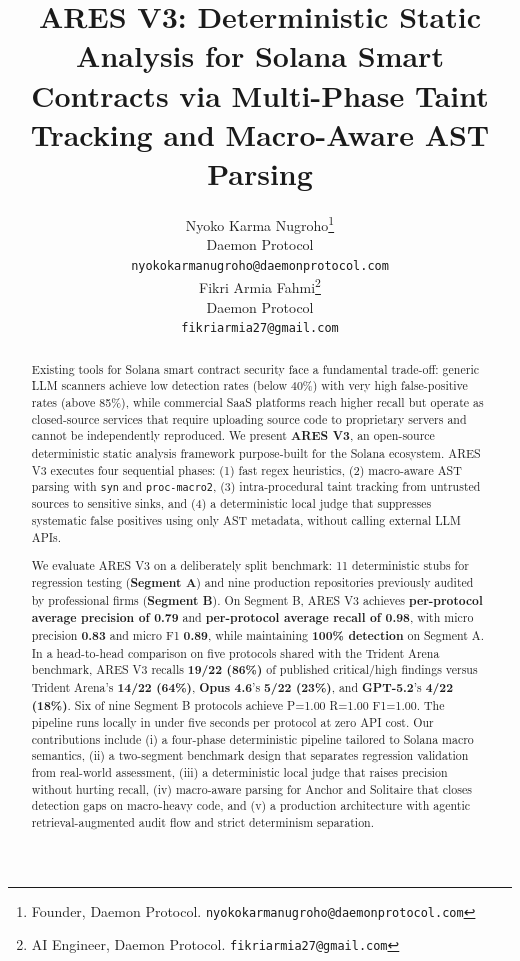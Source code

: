 \documentclass{article}
\title{ARES V3: Deterministic Static Analysis for Solana Smart Contracts via Multi-Phase Taint Tracking and Macro-Aware AST Parsing}
\author{
  Nyoko Karma Nugroho\thanks{Founder, Daemon Protocol. \texttt{nyokokarmanugroho@daemonprotocol.com}} \\
  Daemon Protocol \\
  \texttt{nyokokarmanugroho@daemonprotocol.com} \\
  \And
  Fikri Armia Fahmi\thanks{AI Engineer, Daemon Protocol. \texttt{fikriarmia27@gmail.com}} \\
  Daemon Protocol \\
  \texttt{fikriarmia27@gmail.com} \\
}
\begin{document}
\maketitle

\begin{abstract}
Existing tools for Solana smart contract security face a fundamental trade-off: generic LLM scanners achieve low detection rates (below 40\%) with very high false-positive rates (above 85\%), while commercial SaaS platforms reach higher recall but operate as closed-source services that require uploading source code to proprietary servers and cannot be independently reproduced. We present \textbf{ARES V3}, an open-source deterministic static analysis framework purpose-built for the Solana ecosystem. ARES V3 executes four sequential phases: (1) fast regex heuristics, (2) macro-aware AST parsing with \texttt{syn} and \texttt{proc-macro2}, (3) intra-procedural taint tracking from untrusted sources to sensitive sinks, and (4) a deterministic local judge that suppresses systematic false positives using only AST metadata, without calling external LLM APIs.

We evaluate ARES V3 on a deliberately split benchmark: 11 deterministic stubs for regression testing (\textbf{Segment A}) and nine production repositories previously audited by professional firms (\textbf{Segment B}). On Segment B, ARES V3 achieves \textbf{per-protocol average precision of 0.79} and \textbf{per-protocol average recall of 0.98}, with micro precision \textbf{0.83} and micro F1 \textbf{0.89}, while maintaining \textbf{100\% detection} on Segment A. In a head-to-head comparison on five protocols shared with the Trident Arena benchmark, ARES V3 recalls \textbf{19/22 (86\%)} of published critical/high findings versus Trident Arena's \textbf{14/22 (64\%)}, \textbf{Opus 4.6}'s \textbf{5/22 (23\%)}, and \textbf{GPT-5.2}'s \textbf{4/22 (18\%)}. Six of nine Segment B protocols achieve P=1.00 R=1.00 F1=1.00. The pipeline runs locally in under five seconds per protocol at zero API cost. Our contributions include (i) a four-phase deterministic pipeline tailored to Solana macro semantics, (ii) a two-segment benchmark design that separates regression validation from real-world assessment, (iii) a deterministic local judge that raises precision without hurting recall, (iv) macro-aware parsing for Anchor and Solitaire that closes detection gaps on macro-heavy code, and (v) a production architecture with agentic retrieval-augmented audit flow and strict determinism separation.
\end{abstract}
\end{document}
